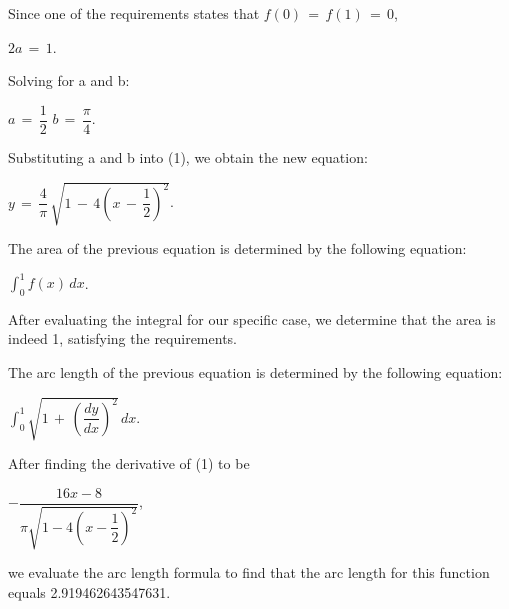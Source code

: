 \documentclass[letterpaper,12pt]{article}
\theoremstyle{definition}
\begin{document}
Since one of the requirements states that $f(0)\,=\,f(1)\,=\,0$,

\begin{center}
    $2a\,=\,1$.
\end{center}

Solving for a and b:

\begin{center}
    $a\,=\,\dfrac{1}{2}$
    \vskip 16pt
    $b\,=\,\dfrac{\pi}{4}$.
\end{center}

Substituting a and b into (1), we obtain the new equation:

\begin{center}
    $y\,=\,\dfrac{4}{\pi}\,\sqrt{1\,-\,4\left(x\,-\,\dfrac{1}{2}\right)^2}$.
\end{center}

\pagebreak

The area of the previous equation is determined by the following equation:

\begin{center}
    $\int_{0}^{1} f(x)\,dx$.
\end{center}

After evaluating the integral for our specific case, we determine that the area is indeed 1, satisfying the requirements.

The arc length of the previous equation is determined by the following equation:

\begin{center}
    $\int_{0}^{1} \sqrt{1\,+\,\left(\dfrac{dy}{dx}\right)^2}\,dx$.
\end{center}

After finding the derivative of (1) to be

\begin{center}
    $-\dfrac{16x-8}{{\pi}\sqrt{1-4\left(x-\dfrac{1}{2}\right)^2}}$,
\end{center}

we evaluate the arc length formula to find that the arc length for this function equals 2.919462643547631.
\end{document}
